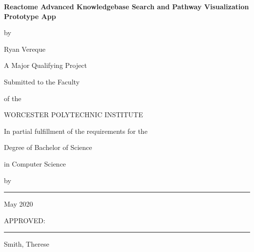 \documentclass[12pt, letterpaper]{report}
\begin{document}
	
\sloppy

\newcommand{\brk}{\vspace*{0.18in}}

\thispagestyle{empty}

\begin{center}

\brk


   {\large 
	\textbf{
	 Reactome Advanced Knowledgebase Search and Pathway Visualization Prototype App
	}
   }


\brk
by

\brk
Ryan Vereque

\brk\brk
A Major Qualifying Project

\brk
Submitted to the Faculty

\brk
of the 

\brk
WORCESTER POLYTECHNIC INSTITUTE
	
\brk
In partial fulfillment of the requirements for the

\brk
Degree of Bachelor of Science

\brk
in Computer Science

\brk


\brk
by

\brk\brk
\rule{3in}{1.2pt}

\brk
May 2020

\end{center}

	
\vfill
APPROVED:

\vspace{0.5in}
\rule{3in}{0.8pt}

Smith, Therese

\newpage

\doublespacing
\end{document}
